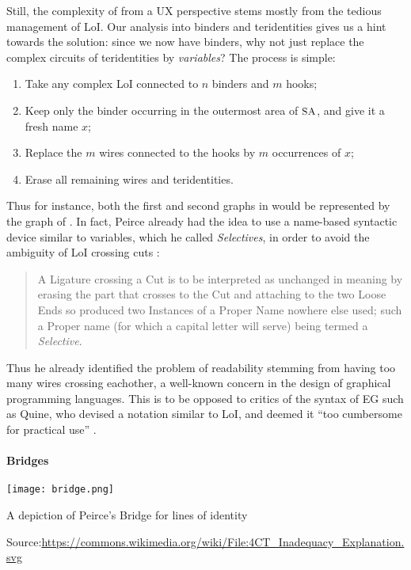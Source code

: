 Still, the complexity of  from a UX perspective stems mostly from the
tedious management of LoI. Our analysis into binders and teridentities gives us
a hint towards the solution: since we now have binders, why not just replace
the complex circuits of teridentities by \emph{variables}? The process is
simple:
\begin{enumerate}
  \item Take any complex LoI connected to $n$ binders and $m$ hooks;
  \item Keep only the binder occurring in the outermost area of $\small\textsc{SA}$, and give
  it a fresh name $x$;
  \item Replace the $m$ wires connected to the hooks by $m$ occurrences of $x$;
  \item Erase all remaining wires and teridentities.
\end{enumerate}
Thus for instance, both the first and second graphs in
 would be represented by the graph of
. In fact, Peirce already had the idea to use a
name-based syntactic device similar to variables, which he called
\emph{Selectives}, in order to avoid the ambiguity of LoI crossing cuts
\cite[p.~531]{peirce_prolegomena_1906}:
\begin{quote}
A Ligature crossing a Cut is to be interpreted as unchanged in meaning by
erasing the part that crosses to the Cut and attaching to the two Loose Ends so
produced two Instances of a Proper Name nowhere else used; such a Proper name
(for which a capital letter will serve) being termed a \emph{Selective}.
\end{quote}
Thus he already identified the problem of readability stemming from having too
many wires crossing eachother, a well-known concern in the design of graphical
programming languages. This is to be opposed to critics of the syntax of EG such
as Quine, who devised a notation similar to LoI, and deemed it ``too cumbersome
for practical use'' \cite[p.~125]{Roberts+1973}.

\paragraph{Bridges} 

\begin{marginfigure}
  \texttt{[image: bridge.png]}
  \caption{A depiction of Peirce's Bridge for lines of identity}
  \footnotesize Source:\hspace{3pt}\url{https://commons.wikimedia.org/wiki/File:4CT_Inadequacy_Explanation.svg}
\end{marginfigure}

